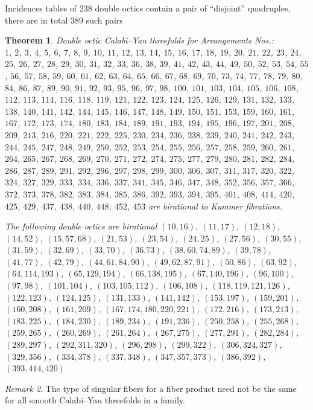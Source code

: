 \documentclass[12pt]{amsart}
\theoremstyle{plain}
\newtheorem{theorem}{Theorem}[section]
\theoremstyle{remark}
\newtheorem{remark}[theorem]{Remark}
\theoremstyle{definition}
\numberwithin{table}{section}
\begin{document}
Incidences tables of 238 double octics contain a pair of ``disjoint'' quadruples, there are in total 389 such pairs


\begin{theorem}
	Double octic Calabi--Yau threefolds for Arrangements Nos.: \\[2mm]
	$1$, $2$, $3$, $4$, $5$, $6$, $7$, $8$, $9$, $10$, $11$, $12$, $13$, $14$, $15$, $16$, $17$, $18$, $19$, $20$, $21$, $22$, $23$, $24$, $25$, $26$, $27$, $28$, $29$, $30$, $31$, $32$, $33$, $36$, $38$, $39$, $41$, $42$, $43$, $44$, $49$, $50$, $52$, $53$, $54$, $55$, $56$, $57$, $58$, $59$, $60$, $61$, $62$, $63$, $64$, $65$, $66$, $67$, $68$, $69$, $70$, $73$, $74$, $77$, $78$, $79$, $80$, $84$, $86$, $87$, $89$, $90$, $91$, $92$, $93$, $95$, $96$, $97$, $98$, $100$, $101$, $103$, $104$, $105$, $106$, $108$, $112$, $113$, $114$, $116$, $118$, $119$, $121$, $122$, $123$, $124$, $125$, $126$, $129$, $131$, $132$, $133$, $138$, $140$, $141$, $142$, $144$, $145$, $146$, $147$, $148$, $149$, $150$, $151$, $153$, $159$, $160$, $161$, $167$, $172$, $173$, $174$, $180$, $183$, $184$, $189$, $191$, $193$, $194$, $195$, $196$, $197$, $201$, $208$, $209$, $213$, $216$, $220$, $221$, $222$, $225$, $230$, $234$, $236$, $238$, $239$, $240$, $241$, $242$, $243$, $244$, $245$, $247$, $248$, $249$, $250$, $252$, $253$, $254$, $255$, $256$, $257$, $258$, $259$, $260$, $261$, $264$, $265$, $267$, $268$, $269$, $270$, $271$, $272$, $274$, $275$, $277$, $279$, $280$, $281$, $282$, $284$, $286$, $287$, $289$, $291$, $292$, $296$, $297$, $298$, $299$, $300$, $306$, $307$, $311$, $317$, $320$, $322$, $324$, $327$, $329$, $333$, $334$, $336$, $337$, $341$, $345$, $346$, $347$, $348$, $352$, $356$, $357$, $366$, $372$, $373$, $378$, $382$, $383$, $384$, $385$, $386$, $392$, $393$, $394$, $395$, $401$, $408$, $414$, $420$, $425$, $429$, $437$, $438$, $440$, $448$, $452$, $453$
	are birational to Kummer fibrations.

	The following double octics are birational
$(10, 16)$, $(11, 17)$, $(12, 18)$, $(14, 52)$, $(15, 57, 68)$, $(21, 53)$, $(23, 54)$, $(24, 25)$, $(27, 56)$, $(30, 55)$, $(31, 59)$, $(32, 69)$, $(33, 70)$, $(36.73)$, $(38, 60, 74, 89)$, $(39, 78)$, $(41, 77)$, $(42, 79)$, $(44, 61, 84, 90)$, $(49, 62, 87, 91)$, $(50, 86)$, $(63, 92)$, $(64, 114, 193)$, $(65, 129, 194)$, $(66, 138, 195)$, $(67, 140, 196)$, $(96, 100)$, $(97, 98)$, $(101, 104)$, $(103, 105, 112)$, $(106, 108)$, $(118, 119, 121, 126)$, $(122, 123)$, $(124, 125)$, $(131, 133)$, $(141, 142)$, $(153, 197)$, $(159, 201)$, $(160, 208)$, $(161, 209)$, $(167, 174, 180, 220, 221)$, $(172, 216)$, $(173, 213)$, $(183, 225)$, $(184, 230)$, $(189, 234)$, $(191, 236)$, $(250, 258)$, $(255, 268)$, $(259, 265)$, $(260, 269)$, $(261, 264)$, $(267, 275)$, $(277, 291)$, $(282, 284)$, $(289, 297)$, $(292, 311, 320)$, $(296, 298)$, $(299, 322)$, $(306, 324, 327)$, $(329, 356)$, $(334, 378)$, $(337, 348)$, $(347, 357, 373)$, $(386, 392)$, $(393, 414, 420)$
\end{theorem}
\begin{remark}
	The type of singular fibers for a fiber product need not be the same for all smooth Calabi--Yau threefolds in a family.
\end{remark}
\end{document}
